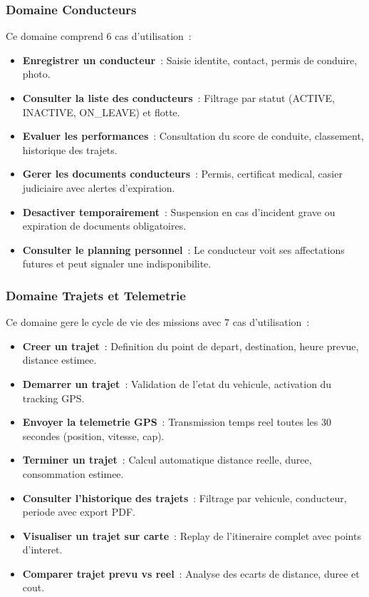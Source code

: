 \documentclass[12pt,a4paper]{report}
\begin{document}
\subsubsection{Domaine Conducteurs}

Ce domaine comprend 6 cas d'utilisation~:
\begin{itemize}[leftmargin=2cm]
  \item \textbf{Enregistrer un conducteur}~: Saisie identite, contact,
        permis de conduire, photo.
  \item \textbf{Consulter la liste des conducteurs}~: Filtrage par statut
        (ACTIVE, INACTIVE, ON\_LEAVE) et flotte.
  \item \textbf{Evaluer les performances}~: Consultation du score de conduite,
        classement, historique des trajets.
  \item \textbf{Gerer les documents conducteurs}~: Permis, certificat medical,
        casier judiciaire avec alertes d'expiration.
  \item \textbf{Desactiver temporairement}~: Suspension en cas d'incident grave
        ou expiration de documents obligatoires.
  \item \textbf{Consulter le planning personnel}~: Le conducteur voit ses
        affectations futures et peut signaler une indisponibilite.
\end{itemize}

\subsubsection{Domaine Trajets et Telemetrie}

Ce domaine gere le cycle de vie des missions avec 7 cas d'utilisation~:
\begin{itemize}[leftmargin=2cm]
  \item \textbf{Creer un trajet}~: Definition du point de depart, destination,
        heure prevue, distance estimee.
  \item \textbf{Demarrer un trajet}~: Validation de l'etat du vehicule,
        activation du tracking GPS.
  \item \textbf{Envoyer la telemetrie GPS}~: Transmission temps reel toutes
        les 30 secondes (position, vitesse, cap).
  \item \textbf{Terminer un trajet}~: Calcul automatique distance reelle,
        duree, consommation estimee.
  \item \textbf{Consulter l'historique des trajets}~: Filtrage par vehicule,
        conducteur, periode avec export PDF.
  \item \textbf{Visualiser un trajet sur carte}~: Replay de l'itineraire
        complet avec points d'interet.
  \item \textbf{Comparer trajet prevu vs reel}~: Analyse des ecarts de
        distance, duree et cout.
\end{itemize}
\end{document}
